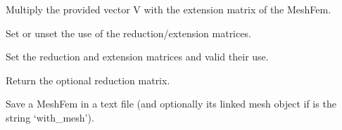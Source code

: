\documentclass[a4paper,11pt,english]{sphinxmanual}
\begin{document}
\begin{fulllineitems}

\begin{fulllineitems}
\label{\detokenize{python/cmdref_MeshFem:getfem.MeshFem.reduce_vector}}
Multiply the provided vector V with the extension matrix of the MeshFem.

\end{fulllineitems}


\begin{fulllineitems}
\label{\detokenize{python/cmdref_MeshFem:getfem.MeshFem.reduction}}
Set or unset the use of the reduction/extension matrices.

\end{fulllineitems}


\begin{fulllineitems}
\label{\detokenize{python/cmdref_MeshFem:getfem.MeshFem.reduction_matrices}}
Set the reduction and extension matrices and valid their use.

\end{fulllineitems}


\begin{fulllineitems}
\label{\detokenize{python/cmdref_MeshFem:getfem.MeshFem.reduction_matrix}}
Return the optional reduction matrix.

\end{fulllineitems}


\begin{fulllineitems}
\label{\detokenize{python/cmdref_MeshFem:getfem.MeshFem.save}}
Save a MeshFem in a text file (and optionally its linked mesh object
if  is the string ‘with\_mesh’).


\end{fulllineitems}
\end{fulllineitems}
\end{document}
